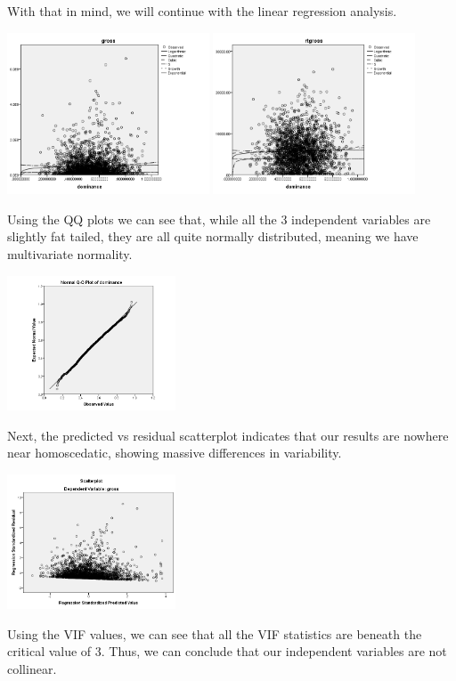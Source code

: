 \documentclass[font=10pt]{article}
\begin{document}
With that in mind, we will continue with the linear regression analysis.

\begin{center}
	\includegraphics[width=6cm]{curve_estimation}
	\includegraphics[width=6cm]{rtgross_curve_estimation}
\end{center}

Using the QQ plots we can see that, while all the 3 independent variables are slightly fat tailed, they are all quite normally distributed, meaning we have multivariate normality.

\begin{center}
	\includegraphics[width=5cm]{dominanceqq}
\end{center}

Next, the predicted vs residual scatterplot indicates that our results are nowhere near homoscedatic, showing massive differences in variability.

\begin{center}
	\includegraphics[width=5cm]{homoscedasticy}
\end{center}
Using the VIF values, we can see that all the VIF statistics are beneath the critical value of 3. Thus, we can conclude that our independent variables are not collinear.
\end{document}
